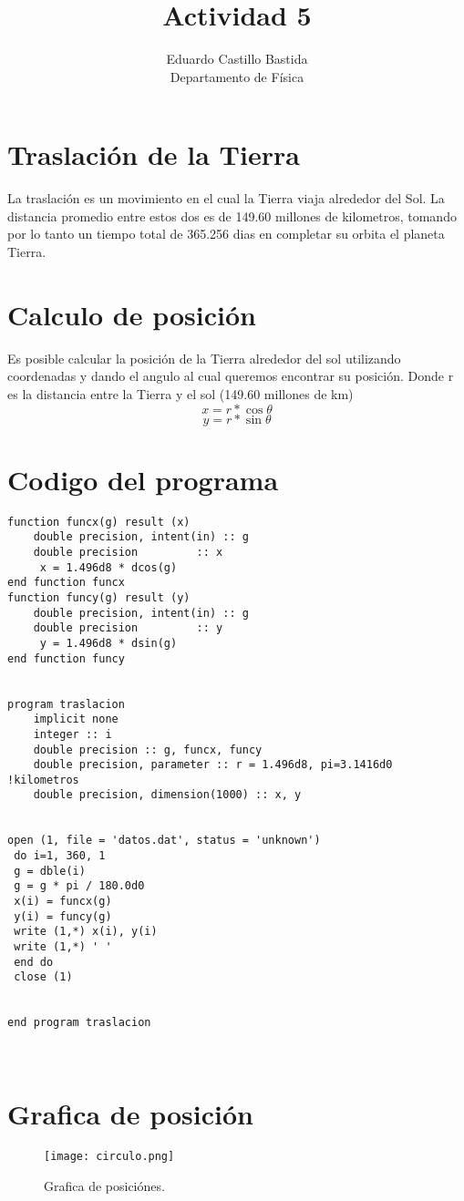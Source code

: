 \documentclass{article}
\title{Actividad 5}
\author{Eduardo Castillo Bastida\\
Departamento de Física
}
\begin{document}
\maketitle
\section{Traslación de la Tierra}
La traslación es un movimiento en el cual la Tierra viaja alrededor del Sol. La distancia promedio entre estos dos es de 149.60 millones de kilometros, tomando por lo tanto un tiempo total de 365.256 dias en completar su orbita el planeta Tierra.

\section{Calculo de posición}
Es posible calcular la posición de la Tierra alrededor del sol utilizando coordenadas y dando el angulo al cual queremos encontrar su posición. Donde r es la distancia entre la Tierra y el sol (149.60 millones de km)
\begin{equation}
x= r * \cos\theta
\end{equation}
\begin{equation}
y= r * \sin\theta
\end{equation}

\clearpage
\section{Codigo del programa}
\begin{verbatim}
function funcx(g) result (x)
	double precision, intent(in) :: g
	double precision 	     :: x
	 x = 1.496d8 * dcos(g)
end function funcx
function funcy(g) result (y)
	double precision, intent(in) :: g
	double precision 	     :: y
	 y = 1.496d8 * dsin(g)
end function funcy


program traslacion
	implicit none
	integer :: i
	double precision :: g, funcx, funcy
	double precision, parameter :: r = 1.496d8, pi=3.1416d0 !kilometros
	double precision, dimension(1000) :: x, y

 
open (1, file = 'datos.dat', status = 'unknown')
 do i=1, 360, 1
 g = dble(i)
 g = g * pi / 180.0d0
 x(i) = funcx(g)
 y(i) = funcy(g)
 write (1,*) x(i), y(i)
 write (1,*) ' '
 end do
 close (1)


end program traslacion
   
 
\end{verbatim}
\clearpage
\section{Grafica de posición}
\begin{figure}
  \texttt{[image: circulo.png]}
  \caption{Grafica de posiciónes.}
\end{figure}
\end{document}
